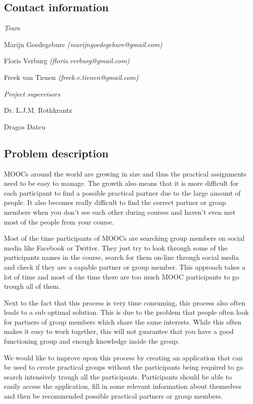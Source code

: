 \documentclass[]{article}
\begin{document}
\subsection{Contact information}
\emph{Team}

Marijn Goedegebure
\emph{(marijngoedegebure@gmail.com)}

Floris Verburg
\emph{(floris.verburg@gmail.com)}

Freek van Tienen
\emph{(freek.v.tienen@gmail.com)}

\noindent\emph{Project supervisors}

Dr. L.J.M. Rothkrantz

Dragos Datcu

\subsection{Problem description}
MOOCs around the world are growing in size and thus the practical assignments need to be easy to manage.
The growth also means that it is more difficult for each participant to find a possible practical partner due to the large amount of people.
It also becomes really difficult to find the correct partner or group members when you don't see each other during courses and haven't even met most of the people from your course.

Most of the time participants of MOOCs are searching group members on social media like Facebook or Twitter.
They just try to look through some of the participants names in the course, search for them on-line through social media and check if they are a capable partner or group member.
This approach takes a lot of time and most of the time there are too much MOOC participants to go trough all of them.

Next to the fact that this process is very time consuming, this process also often leads to a sub optimal solution.
This is due to the problem that people often look for partners of group members which share the same interests.
While this often makes it easy to work together, this will not guarantee that you have a good functioning group and enough knowledge inside the group.

We would like to improve upon this process by creating an application that can be used to create practical groups without the participants being required to go search intensively trough all the participants.
Participants should be able to easily access the application, fill in some relevant information about themselves and then be recommended possible practical partners or group members.
\end{document}
